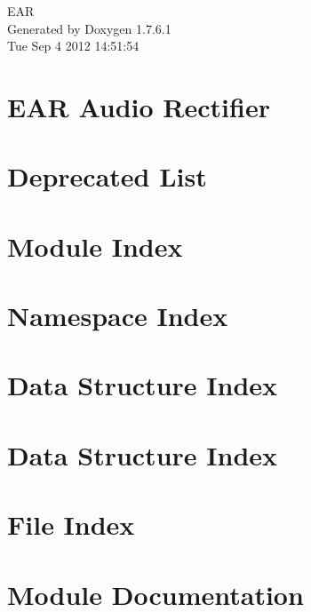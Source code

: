 \documentclass[a4paper]{book}
\begin{document}
\hypersetup{pageanchor=false,citecolor=blue}
\begin{titlepage}
\vspace*{7cm}
\begin{center}
{\Large \-E\-A\-R }\\
\vspace*{1cm}
{\large \-Generated by Doxygen 1.7.6.1}\\
\vspace*{0.5cm}
{\small Tue Sep 4 2012 14:51:54}\\
\end{center}
\end{titlepage}
\clearemptydoublepage
{}
\tableofcontents
\clearemptydoublepage
{}
\hypersetup{pageanchor=true,citecolor=blue}
\chapter{\-E\-A\-R \-Audio \-Rectifier}
\label{index}\hypertarget{index}{}
\chapter{\-Deprecated \-List}
\label{deprecated}
\hypertarget{deprecated}{}

\chapter{\-Module \-Index}

\chapter{\-Namespace \-Index}

\chapter{\-Data \-Structure \-Index}

\chapter{\-Data \-Structure \-Index}

\chapter{\-File \-Index}

\chapter{\-Module \-Documentation}













\end{document}
